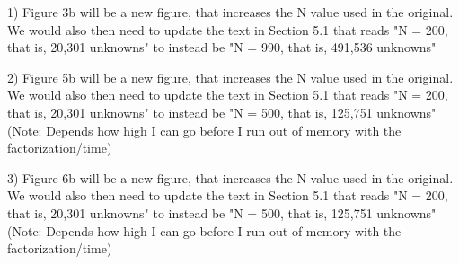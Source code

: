 \documentclass[11pt, oneside]{article}   	%
\begin{document}
1) Figure 3b will be a new figure, that increases the N value used in the original. We would also then need to update the text in Section 5.1 that reads "N = 200, that is, 20,301 unknowns" to instead be "N = 990, that is, 491,536 unknowns"

2) Figure 5b will be a new figure, that increases the N value used in the original. We would also then need to update the text in Section 5.1 that reads "N = 200, that is, 20,301 unknowns" to instead be "N = 500, that is, 125,751 unknowns" (Note: Depends how high I can go before I run out of memory with the factorization/time)

3) Figure 6b will be a new figure, that increases the N value used in the original. We would also then need to update the text in Section 5.1 that reads "N = 200, that is, 20,301 unknowns" to instead be "N = 500, that is, 125,751 unknowns" (Note: Depends how high I can go before I run out of memory with the factorization/time)
\end{document}
